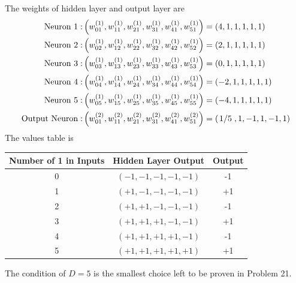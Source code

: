 \documentclass[12pt]{article}
\newcommand{\ParTh}[1]{\left(#1\right)}
\newcommand{\Divide}[2]{\left.#1\middle/#2\right.}
\begin{document}
The weights of hidden layer and output layer are
\begin{align}
\text{Neuron 1}:&\ParTh{w^{\ParTh{1}}_{01},w^{\ParTh{1}}_{11},w^{\ParTh{1}}_{21},w^{\ParTh{1}}_{31},w^{\ParTh{1}}_{41},w^{\ParTh{1}}_{51}}=\ParTh{4,1,1,1,1,1}\\
\text{Neuron 2}:&\ParTh{w^{\ParTh{1}}_{02},w^{\ParTh{1}}_{12},w^{\ParTh{1}}_{22},w^{\ParTh{1}}_{32},w^{\ParTh{1}}_{42},w^{\ParTh{1}}_{52}}=\ParTh{2,1,1,1,1,1}\\
\text{Neuron 3}:&\ParTh{w^{\ParTh{1}}_{03},w^{\ParTh{1}}_{13},w^{\ParTh{1}}_{23},w^{\ParTh{1}}_{33},w^{\ParTh{1}}_{43},w^{\ParTh{1}}_{53}}=\ParTh{0,1,1,1,1,1}\\
\text{Neuron 4}:&\ParTh{w^{\ParTh{1}}_{04},w^{\ParTh{1}}_{14},w^{\ParTh{1}}_{24},w^{\ParTh{1}}_{34},w^{\ParTh{1}}_{44},w^{\ParTh{1}}_{54}}=\ParTh{-2,1,1,1,1,1}\\
\text{Neuron 5}:&\ParTh{w^{\ParTh{1}}_{05},w^{\ParTh{1}}_{15},w^{\ParTh{1}}_{25},w^{\ParTh{1}}_{35},w^{\ParTh{1}}_{45},w^{\ParTh{1}}_{55}}=\ParTh{-4,1,1,1,1,1}\\
\text{Output Neuron}:&\ParTh{w^{\ParTh{2}}_{01},w^{\ParTh{2}}_{11},w^{\ParTh{2}}_{21},w^{\ParTh{2}}_{31},w^{\ParTh{2}}_{41},w^{\ParTh{2}}_{51}}=\ParTh{\Divide{1}{5},1,-1,1,-1,1}
\end{align}
The values table is
\renewcommand\arraystretch{1.5}
\begin{center}
\begin{tabular}{ | c | c | c | }
  \hline
  Number of 1 in Inputs & Hidden Layer Output & Output \\ \hline
  0&$\ParTh{-1,-1,-1,-1,-1}$&-1 \\ \hline
  1&$\ParTh{+1,-1,-1,-1,-1}$&+1 \\ \hline
  2&$\ParTh{+1,+1,-1,-1,-1}$&-1 \\ \hline
  3&$\ParTh{+1,+1,+1,-1,-1}$&+1 \\ \hline
  4&$\ParTh{+1,+1,+1,+1,-1}$&-1 \\ \hline
  5&$\ParTh{+1,+1,+1,+1,+1}$&+1 \\ \hline
\end{tabular}
\end{center}
The condition of $D=5$ is the smallest choice left to be proven in Problem 21.
\end{document}

